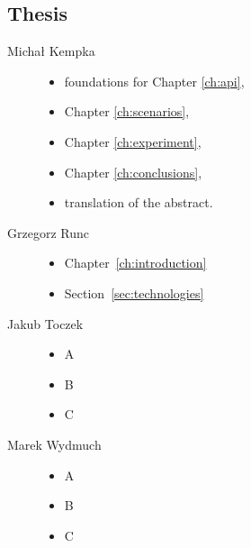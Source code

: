 	\subsection{Thesis}
	\begin{description}
		\item[Michał Kempka] \hfill
			\begin{itemize}
				\item foundations for Chapter \ref{ch:api},
				\item Chapter \ref{ch:scenarios},
				\item Chapter \ref{ch:experiment},
				\item Chapter \ref{ch:conclusions},
				\item translation of the abstract.
			\end{itemize}
		\item[Grzegorz Runc] \hfill
			\begin{itemize}
				\item Chapter~\ref{ch:introduction}
				\item Section~\ref{sec:technologies}
			\end{itemize}
		\item[Jakub Toczek] \hfill
			\begin{itemize}
				\item A
				\item B
				\item C
			\end{itemize}
		\item[Marek Wydmuch] \hfill
			\begin{itemize}
				\item A
				\item B
				\item C
			\end{itemize}
	\end{description}
